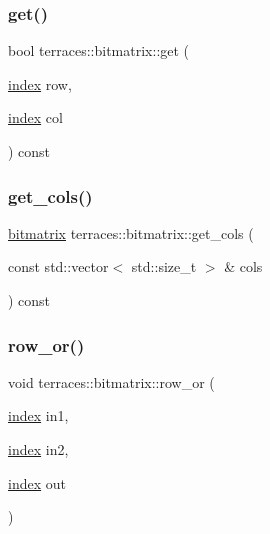 \subsubsection{\texorpdfstring{get()}{get()}}
{\footnotesize\ttfamily bool terraces\+::bitmatrix\+::get (\begin{DoxyParamCaption}\item[{\hyperlink{namespaceterraces_adbc33ccb543d1634e96d0eb02e472c77}{index}}]{row,  }\item[{\hyperlink{namespaceterraces_adbc33ccb543d1634e96d0eb02e472c77}{index}}]{col }\end{DoxyParamCaption}) const}

\mbox{\label{classterraces_1_1bitmatrix_a0da6fd3a2321c19fdb802ba825d83d24}} 
\subsubsection{\texorpdfstring{get\+\_\+cols()}{get\_cols()}}
{\footnotesize\ttfamily \hyperlink{classterraces_1_1bitmatrix}{bitmatrix} terraces\+::bitmatrix\+::get\+\_\+cols (\begin{DoxyParamCaption}\item[{const std\+::vector$<$ std\+::size\+\_\+t $>$ \&}]{cols }\end{DoxyParamCaption}) const}

\mbox{\label{classterraces_1_1bitmatrix_a36a4964456f0d7f0eeb389e42124fa84}} 
\subsubsection{\texorpdfstring{row\+\_\+or()}{row\_or()}}
{\footnotesize\ttfamily void terraces\+::bitmatrix\+::row\+\_\+or (\begin{DoxyParamCaption}\item[{\hyperlink{namespaceterraces_adbc33ccb543d1634e96d0eb02e472c77}{index}}]{in1,  }\item[{\hyperlink{namespaceterraces_adbc33ccb543d1634e96d0eb02e472c77}{index}}]{in2,  }\item[{\hyperlink{namespaceterraces_adbc33ccb543d1634e96d0eb02e472c77}{index}}]{out }\end{DoxyParamCaption})}

